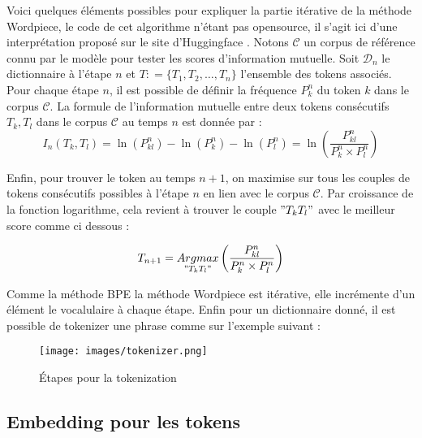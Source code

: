 \documentclass[12pt]{article}
\theoremstyle{definition}
\begin{document}
	Voici quelques éléments possibles pour expliquer la partie itérative de la méthode Wordpiece, le code de cet algorithme n'étant pas opensource, il s'agit ici d'une interprétation proposé sur le site d'Huggingface \cite{wordpiecehuggingface}. Notons $\mathcal{C}$ un corpus de référence connu par le modèle pour tester les scores d'information mutuelle. Soit $\mathcal{D}_n$ le dictionnaire à l'étape $n$ et $T : = \{T_1,T_2,\dots,T_n\}$ l'ensemble des tokens associés. Pour chaque étape $n$, il est possible de définir la fréquence $P_k^n$ du token $k$ dans le corpus $\mathcal{C}$. La formule de l'information mutuelle entre deux tokens consécutifs $T_k,T_l$ dans le corpus $\mathcal{C}$ au temps $n$ est donnée par :
	$$I_n(T_k,T_l)  = \ln(P_{kl}^n)-\ln(P_k^n)-\ln(P_l^n) = \ln\left(\dfrac{P_{kl}^n}{P_k^n\times P_l^n}\right)$$ 
	
	Enfin, pour trouver le token au temps $n+1$, on maximise sur tous les couples de tokens consécutifs possibles à l'étape $n$ en lien avec le corpus $\mathcal{C}$. Par croissance de la fonction logarithme, cela revient à trouver le couple $"T_kT_l"$ avec le meilleur score comme ci dessous :
	
	$$T_{n+1} = \underset{"T_kT_l" }{Argmax}\left(\dfrac{P_{kl}^n}{P_k^n\times P_l^n}\right)$$
	
	

	Comme la méthode BPE la méthode Wordpiece est itérative, elle incrémente d'un élément le vocalulaire à chaque étape. Enfin pour un dictionnaire donné, il est possible de tokenizer une phrase comme sur l'exemple suivant : 
	
	\begin{figure*}[!h]
		\centering
		\texttt{[image: images/tokenizer.png]}
		\caption{Étapes pour la tokenization}
	\end{figure*}
	
	\subsection{Embedding pour les tokens}
\end{document}
